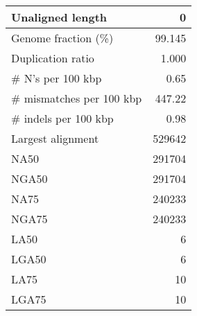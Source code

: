 \documentclass[12pt,a4paper]{article}
\begin{document}
\begin{table}[ht]
\begin{center}
\begin{tabular}{|l*{1}{|r}|}
Unaligned length & 0 \\ \hline
Genome fraction (\%) & 99.145 \\ \hline
Duplication ratio & 1.000 \\ \hline
\# N's per 100 kbp & 0.65 \\ \hline
\# mismatches per 100 kbp & 447.22 \\ \hline
\# indels per 100 kbp & 0.98 \\ \hline
Largest alignment & 529642 \\ \hline
NA50 & 291704 \\ \hline
NGA50 & 291704 \\ \hline
NA75 & 240233 \\ \hline
NGA75 & 240233 \\ \hline
LA50 & 6 \\ \hline
LGA50 & 6 \\ \hline
LA75 & 10 \\ \hline
LGA75 & 10 \\ \hline
\end{tabular}
\end{center}
\end{table}
\end{document}
